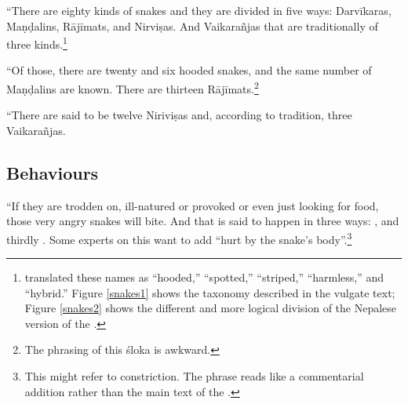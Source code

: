     \begin{translation}
        \item[9cd--10]    
        
        “There are eighty kinds of snakes and they are divided in five ways:
        Darvīkaras, Maṇḍalins, Rājīmats, and Nirviṣas.  And Vaikarañjas that are
        traditionally of three kinds.\footnote{\citet{hari-2011} translated these
            names as “hooded,” “spotted,” “striped,” “harmless,” and “hybrid.” Figure 
            \ref{snakes1} shows the taxonomy described in the vulgate text; Figure 
            \ref{snakes2} shows the different and more logical division of the Nepalese 
            version of the \SS.}
            
    \item [11] 
    
    “Of those, there are twenty and six hooded snakes, and the same number
of Maṇḍalins are known.  There are thirteen Rājīmats.\footnote{The phrasing of
    this śloka is awkward.}
    
    \item [12]
    
    “There are said to be twelve Niriviṣas and, according to tradition, three 
    Vaikarañjas.
    
    
\subsection{Behaviours}    

    \item [13--14ef]
    
“If they are trodden on, ill-natured or provoked or even just looking for
food, those very angry snakes will bite.  And that is said to happen in
three ways: ,  and thirdly
.  Some experts on this want to add “hurt by the
snake's body”.\footnote{This might refer to constriction.  The phrase reads
    like a commentarial addition rather than the main text of the \SS.}

\item[15--16]


\end{translation}
